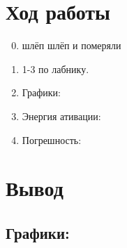 \documentclass[11pt,a4paper]{article}
\begin{document}
\section*{Ход работы}
\begin{enumerate}
  \setcounter{enumi}{-1}
  \item шлёп шлёп и померяли
  \item 1-3 по лабнику.
  \item Графики:
  \item Энергия ативации:
  \item Погрешность:
\end{enumerate}

\section*{Вывод}
  \subsection*{\textbf{Графики:}}
  \begin{figure}[h]
    \label{fig:graph1}
  \end{figure}
  \newpage
  \begin{figure}[h]
    \label{fig:graph2}
  \end{figure}
\end{document}
